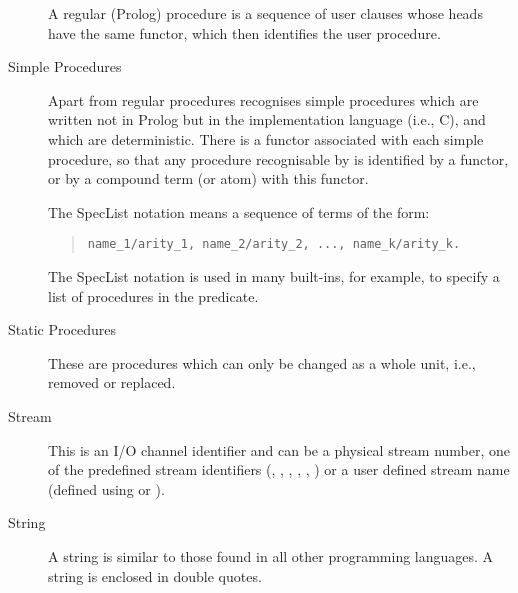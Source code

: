 \begin{description}
A regular (Prolog) procedure is a sequence of user clauses whose heads
have the same functor, which then identifies the user procedure.


\item[Simple Procedures\index{simple procedure}\index{procedure!simple}]
Apart from regular procedures {\eclipse} recognises simple procedures
which are written not in Prolog but in the implementation language (i.e., C),
and which are deterministic.
There is a functor associated with each
simple procedure, so that
any procedure recognisable by {\eclipse} is identified by a functor,
or by a compound term (or atom) with this functor.

\item[\Index{SpecList}]
The SpecList notation means a sequence of  terms of the form:
\begin{quote}
\begin{verbatim}
name_1/arity_1, name_2/arity_2, ..., name_k/arity_k.
\end{verbatim}
\end{quote}
The SpecList notation is used in many built-ins, for example,
to specify a list of procedures in the
 predicate.

\item[Static Procedures\index{static procedure}\index{procedure!static}]
These are procedures which can only be changed as a whole unit, i.e., removed or
replaced.

\item[Stream\index{stream}]
This is an I/O channel identifier and can be a physical stream number, one of
the predefined stream identifiers (, ,
, , ,
)
or a user defined stream name (defined using
 or
 ).

\item[String\index{string}]
A string is similar to those found in all other programming languages.  A string
is enclosed in double quotes.


\end{description}
